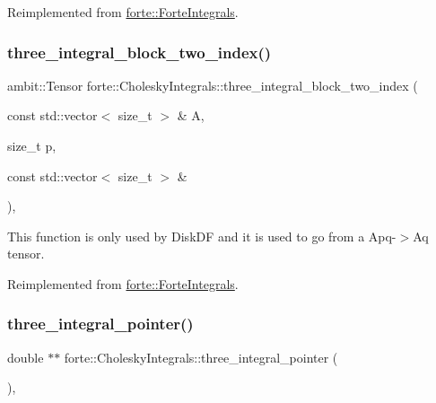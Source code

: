 Reimplemented from \mbox{\hyperlink{classforte_1_1_forte_integrals_aa1d259ae97b5a9c96ccb20599543b126}{forte\+::\+Forte\+Integrals}}.

\mbox{\label{classforte_1_1_cholesky_integrals_a4f07e4c8e13a3424ec6b3d3a4d59a258}} 
\subsubsection{\texorpdfstring{three\+\_\+integral\+\_\+block\+\_\+two\+\_\+index()}{three\_integral\_block\_two\_index()}}
{\footnotesize\ttfamily ambit\+::\+Tensor forte\+::\+Cholesky\+Integrals\+::three\+\_\+integral\+\_\+block\+\_\+two\+\_\+index (\begin{DoxyParamCaption}\item[{const std\+::vector$<$ size\+\_\+t $>$ \&}]{A,  }\item[{size\+\_\+t}]{p,  }\item[{const std\+::vector$<$ size\+\_\+t $>$ \&}]{ }\end{DoxyParamCaption})\hspace{0.3cm}{\ttfamily [override]}, {\ttfamily [virtual]}}



This function is only used by Disk\+DF and it is used to go from a Apq-\/$>$Aq tensor. 



Reimplemented from \mbox{\hyperlink{classforte_1_1_forte_integrals_aab51824020dc3588c026b5b7740f55a9}{forte\+::\+Forte\+Integrals}}.

\mbox{\label{classforte_1_1_cholesky_integrals_ac92cb7a11e5a027ba6ccd11181ddf61a}} 
\subsubsection{\texorpdfstring{three\+\_\+integral\+\_\+pointer()}{three\_integral\_pointer()}}
{\footnotesize\ttfamily double $\ast$$\ast$ forte\+::\+Cholesky\+Integrals\+::three\+\_\+integral\+\_\+pointer (\begin{DoxyParamCaption}{ }\end{DoxyParamCaption})\hspace{0.3cm}{\ttfamily [override]}, {\ttfamily [virtual]}}



